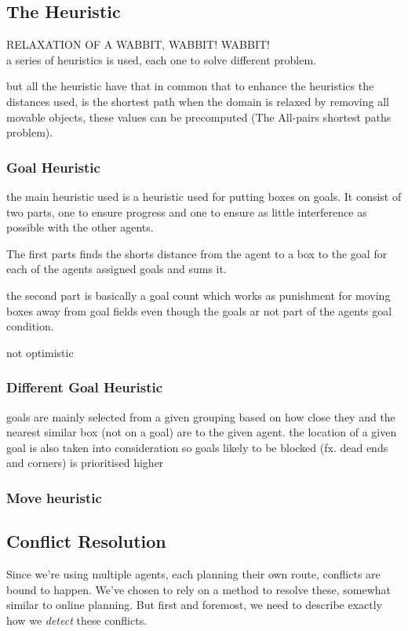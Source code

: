 \documentclass[letterpaper]{article}
\begin{document}
		\subsection{The Heuristic}
			RELAXATION OF A WABBIT, WABBIT! WABBIT!\\
			a series of heuristics is used, each one to solve different problem.
			
			but all the heuristic have that in common that to enhance the heuristics the distances used, is the shortest path when the domain is relaxed by removing all movable objects, these values can be precomputed (The All-pairs shortest paths problem).
					
			
			\subsubsection{Goal Heuristic}
			the main heuristic used is a heuristic used for putting boxes on goals.
			It consist of two parts, one to ensure progress and one to ensure as little interference as possible with the other agents.
			
			The first parts finds the shorts distance from the agent to a box to the goal for each of the agents assigned goals and sums it.
			
			the second part is basically a goal count which works as punishment for moving boxes away from goal fields even though the goals ar not part of the agents goal condition.
			
			not optimistic
			
			\subsubsection{Different Goal Heuristic}
				goals are mainly selected from a given grouping based on how close they and the nearest similar box (not on a goal) are to the given agent. the location of a given goal is also taken into consideration so goals likely to be blocked (fx. dead ends and corners) is prioritised higher	
				
			\subsubsection{Move heuristic}	

	\subsection{Conflict Resolution}
		Since we're using multiple agents, each planning their own route, conflicts are bound to happen. We've chosen to rely on a method to resolve these, somewhat similar to online planning. But first and foremost, we need to describe exactly how we \emph{detect} these conflicts.
\end{document}
